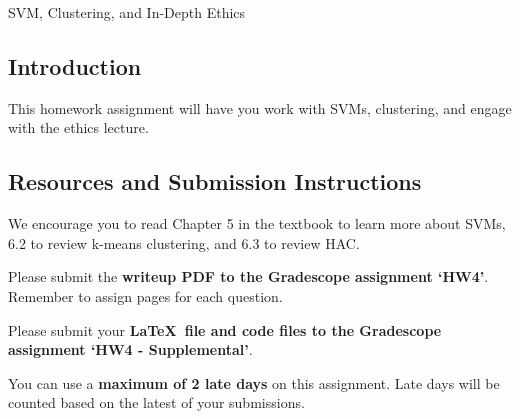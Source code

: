 \documentclass[submit]{../harvardml}
\begin{document}
\begin{center}
{\Large SVM, Clustering, and In-Depth Ethics}\\
\end{center}

\subsection*{Introduction}

This homework assignment will have you work with SVMs, clustering, and engage with the ethics lecture.

\subsection*{Resources and Submission Instructions}
We encourage you to
read Chapter 5 in the textbook to learn more about SVMs, 6.2 to review k-means clustering, and 6.3 to review HAC.

Please submit the \textbf{writeup PDF to the Gradescope assignment `HW4'}. Remember to assign pages for each question.

Please submit your \textbf{\LaTeX\ file and code files to the Gradescope assignment `HW4 - Supplemental'}. 

You can use a \textbf{maximum of 2 late days} on this assignment.  Late days will be counted based on the latest of your submissions. 

\newpage
\end{document}
